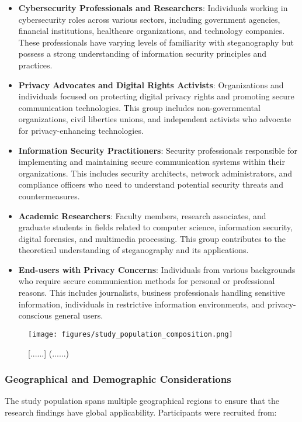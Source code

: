 \documentclass[12pt, a4paper, oneside]{book}
\begin{document}
\begin{itemize}[leftmargin=*]
    \item \textbf{Cybersecurity Professionals and Researchers}: Individuals working in cybersecurity roles across various sectors, including government agencies, financial institutions, healthcare organizations, and technology companies. These professionals have varying levels of familiarity with steganography but possess a strong understanding of information security principles and practices.

    \item \textbf{Privacy Advocates and Digital Rights Activists}: Organizations and individuals focused on protecting digital privacy rights and promoting secure communication technologies. This group includes non-governmental organizations, civil liberties unions, and independent activists who advocate for privacy-enhancing technologies.

    \item \textbf{Information Security Practitioners}: Security professionals responsible for implementing and maintaining secure communication systems within their organizations. This includes security architects, network administrators, and compliance officers who need to understand potential security threats and countermeasures.

    \item \textbf{Academic Researchers}: Faculty members, research associates, and graduate students in fields related to computer science, information security, digital forensics, and multimedia processing. This group contributes to the theoretical understanding of steganography and its applications.

    \item \textbf{End-users with Privacy Concerns}: Individuals from various backgrounds who require secure communication methods for personal or professional reasons. This includes journalists, business professionals handling sensitive information, individuals in restrictive information environments, and privacy-conscious general users.
\end{itemize}

\begin{figure}[htbp]
    \centering
    \texttt{[image: figures/study\_population\_composition.png]}
    \caption{[......] (......)}
    \label{fig:study_population}
\end{figure}

\subsubsection{Geographical and Demographic Considerations}
The study population spans multiple geographical regions to ensure that the research findings have global applicability. Participants were recruited from:
\end{document}
